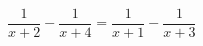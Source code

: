 \begin{ex}[type=equation]
	\begin{condition}
		$\dfrac{1}{x + 2} - \dfrac{1}{x + 4} = \dfrac{1}{x  + 1} - \dfrac{1}{x + 3}$
	\end{condition}
\end{ex}
